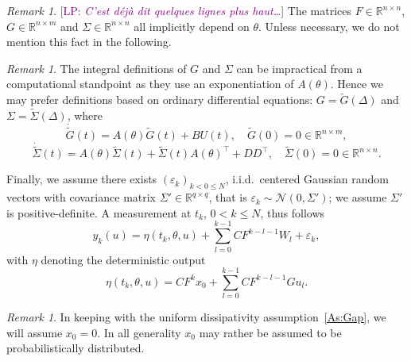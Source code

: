 \documentclass[a4paper]{article}
\newcommand{\LP}[1]{{\textcolor{purple}{[LP: \textit{#1}]}}}
\theoremstyle{definition}
\theoremstyle{remark}
\newtheorem{remark}[theorem]{Remark}
\newcommand{\R}{\mathbb{R}}
\begin{document}
\begin{remark}\LP{C'est déjà dit quelques lignes plus haut\ldots}
The matrices $F\in \R^{n\times n}$, $G\in \R^{n\times m}$ and $\Sigma\in \R^{n\times n}$ all implicitly depend on $\theta$. Unless necessary, we do not mention this fact in the following.
\end{remark}
\begin{remark}
The integral definitions of $G$ and $\Sigma$ can be  impractical from a computational standpoint as they use an exponentiation of $A(\theta)$. Hence we may prefer definitions based on ordinary differential equations: $G=\tilde G(\Delta)$ and $\Sigma=\tilde \Sigma(\Delta)$, where 
$$
\dot{\tilde{G}}(t)= A(\theta)\tilde{G}(t)+BU(t),\quad {\tilde{G}}(0)=0\in \R^{n\times m},
$$
$$
\dot{\tilde{\Sigma}}(t)= A(\theta)\tilde{\Sigma}(t)+\tilde{\Sigma}(t)A(\theta)^{\top}+D D^\top ,\quad {\tilde{\Sigma}}(0)=0\in \R^{n\times n}.
$$
\end{remark}
Finally, we assume there exists $(\varepsilon_k)_{k< 0 \leq N}$, i.i.d.\ centered Gaussian random vectors with covariance matrix $\Sigma'\in \R^{q\times q}$, that is $\varepsilon_k\sim \mathcal{N}(0,\Sigma')$; we assume $\Sigma'$ is  positive-definite. A measurement  at $t_k$, $0< k \leq  N$, thus follows
\begin{equation}\label{E:measurement}
y_k(u)
=\eta(t_k,\theta,u)+\sum_{l=0}^{k-1} C F^{k-l-1}W_{l}+\varepsilon_k,
\end{equation}
with $\eta$ denoting the deterministic output
\begin{equation}\label{E:output}
\eta(t_k,\theta,u)
=
CF^{k}x_0+\sum_{l=0}^{k-1} C F^{k-l-1}Gu_{l} .
\end{equation}

\begin{remark}
In keeping with the uniform dissipativity assumption~\ref{As:Gap}, we will assume $x_0=0$. In all generality $x_0$ may rather be assumed to be probabilistically distributed.
\end{remark}
\end{document}
